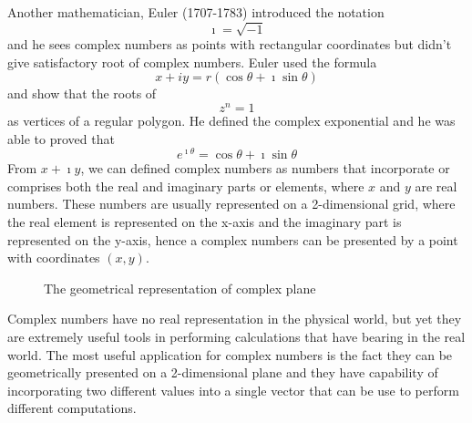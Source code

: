 \documentclass[12pt]{report}
\newcommand{\NI}{\noindent}
\newcommand{\real}{ \mathbb{R}}
\newcommand{\imaginary}{\imath}
\begin{document}
	\NI Another mathematician, Euler (1707-1783) introduced the notation 
	\begin{equation}
		\imaginary = \sqrt{-1}\label{eq:1_7}
	\end{equation}
	 and he sees complex numbers as points with rectangular coordinates but didn't give satisfactory root of complex numbers. Euler used the formula
	\begin{equation}
		x+iy= r(\cos\theta + \imaginary\sin\theta)\label{eq:1_8}
	\end{equation}
	and show that the roots of 
	\begin{equation}
		z^n=1\label{eq:1_9}
	\end{equation}
	as vertices of a regular polygon. He defined the complex exponential and he was able to proved that 
	\begin{equation}
		e^{\imaginary\theta} = \cos\theta + \imaginary\sin\theta\label{eq:1_10}
	\end{equation}
	From $x+\imaginary y$, we can defined complex numbers as numbers that incorporate or comprises both the real and imaginary parts or elements, where $x$ and $y$ are real numbers. These numbers are usually represented on a 2-dimensional grid, where the real element is represented on the x-axis and the imaginary part is represented on the y-axis, hence a complex numbers can be presented by a point with coordinates $(x,y)$.
	
	\begin{figure}[!h]
		\centering
		\caption{The geometrical representation of complex plane}\label{fig:1_1}
	\end{figure}
	Complex numbers have no real representation in the physical world, but yet they are extremely useful tools in performing calculations that have bearing in the real world. The most useful application for complex numbers is the fact they can be geometrically presented on a 2-dimensional plane and they have capability of incorporating two different values into a single vector that can be use to perform different computations.\\
	
\end{document}
